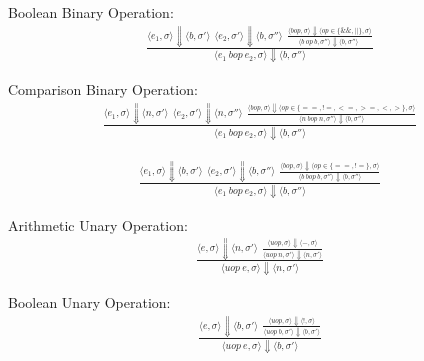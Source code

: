\documentclass[12pt]{article}
\begin{document}
	Boolean Binary Operation:
	\begin{align*}
		\frac{
		\langle e_1, \sigma \rangle\Downarrow \langle b, \sigma' \rangle \ \ 
		\langle e_2, \sigma' \rangle\Downarrow \langle b, \sigma'' \rangle \ \ 
		\frac{
			\langle bop, \sigma \rangle\Downarrow \langle op \in \{\&\&, ||\} , \sigma \rangle
		}{
			\langle b\ op\ b, \sigma'' \rangle\Downarrow \langle b, \sigma'' \rangle \ \ 
		}}
		{\langle e_1\ bop\ e_2, \sigma \rangle\Downarrow \langle b, \sigma'' \rangle}
	\end{align*}


	Comparison Binary Operation:
	\begin{align*}
		\frac{
		\langle e_1, \sigma \rangle\Downarrow \langle n, \sigma' \rangle \ \ 
		\langle e_2, \sigma' \rangle\Downarrow \langle n, \sigma'' \rangle \ \
		\frac{
			\langle bop, \sigma \rangle\Downarrow \langle op \in \{==, !=, <=, >=, <, >\} , \sigma \rangle
		}{
			\langle n\ bop\ n, \sigma'' \rangle\Downarrow \langle b, \sigma'' \rangle
		}}
		{\langle e_1\ bop\ e_2, \sigma \rangle\Downarrow \langle b, \sigma'' \rangle}
	\end{align*}
	
	\begin{align*}
		\frac{
		\langle e_1, \sigma \rangle\Downarrow \langle b, \sigma' \rangle \ \ 
		\langle e_2, \sigma' \rangle\Downarrow \langle b, \sigma'' \rangle \ \
		\frac{
			\langle bop, \sigma \rangle\Downarrow \langle op \in \{==, !=\} , \sigma \rangle
		}{
			\langle b\ bop\ b, \sigma'' \rangle\Downarrow \langle b, \sigma'' \rangle
		}}
		{\langle e_1\ bop\ e_2, \sigma \rangle\Downarrow \langle b, \sigma'' \rangle}
	\end{align*}


	Arithmetic Unary Operation:
	\begin{align*}
		\frac{
		\langle e, \sigma \rangle\Downarrow \langle n, \sigma' \rangle \ \ 
		\frac{
			\langle uop, \sigma \rangle\Downarrow \langle -, \sigma \rangle
		}{
			\langle uop\ n, \sigma' \rangle\Downarrow \langle n, \sigma' \rangle
		}}
		{\langle uop\ e, \sigma \rangle\Downarrow \langle n, \sigma' \rangle}
	\end{align*}


	Boolean Unary Operation:
	\begin{align*}
		\frac{
		\langle e, \sigma \rangle\Downarrow \langle b, \sigma' \rangle \ \ 
		\frac{
			\langle uop, \sigma \rangle\Downarrow \langle !, \sigma \rangle
		}{
			\langle uop\ b, \sigma' \rangle\Downarrow \langle b, \sigma' \rangle
		}}
		{\langle uop\ e, \sigma \rangle\Downarrow \langle b, \sigma' \rangle}
	\end{align*}
\end{document}
